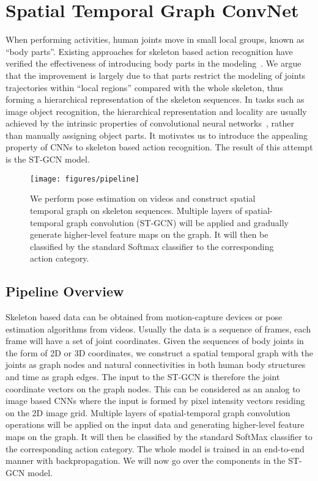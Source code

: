 \documentclass[letterpaper]{article} \usepackage{aaai18}  \usepackage{times}  \usepackage{helvet}  \usepackage{courier}  \usepackage{url}  \usepackage{graphicx}
\begin{document}
\section{Spatial Temporal Graph ConvNet}
When performing activities, human joints move in small local groups, known as ``body parts''.
Existing approaches for skeleton based action recognition have verified the effectiveness of introducing body parts in the modeling~\cite{Shahroudy2016CVPR,Liu2016ECCV,Zhang2017WACV}. 
We argue that the improvement is largely due to that parts restrict the modeling of joints trajectories within ``local regions'' compared with the whole skeleton, thus forming a hierarchical representation of the skeleton sequences.
In tasks such as image object recognition, the hierarchical representation and locality are usually achieved by the intrinsic properties of  convolutional neural networks~\cite{Krizhevsky2012Imagenet}, rather than manually assigning object parts.
It motivates us to introduce the appealing property of CNNs to skeleton based action recognition.
The result of this attempt is the ST-GCN model.
\begin{figure*}
	\centering
	\texttt{[image: figures/pipeline]}
	\caption{
		We perform pose estimation on videos and construct spatial temporal graph on skeleton sequences. Multiple layers
		of spatial-temporal graph convolution (ST-GCN) will be applied and gradually generate higher-level feature maps on the graph.
		It will then be classified by the standard Softmax classifier to the corresponding action category.
	}
	\label{fig:pipeline}
\end{figure*}
\subsection{Pipeline Overview}
Skeleton based data can be obtained from motion-capture devices or pose estimation algorithms from videos.
Usually the data is a sequence of frames, each frame will have a set of joint coordinates.
Given the sequences of body joints in the form of 2D or 3D coordinates, we construct a spatial temporal graph with the joints as graph nodes and natural connectivities in both human body structures and time as graph edges.
The input to the ST-GCN is therefore the joint coordinate vectors on the graph nodes. 
This can be considered as an analog to image based CNNs where the input is formed by pixel intensity vectors residing on the 2D image grid.
Multiple layers of spatial-temporal graph convolution operations will be applied on the input data and generating higher-level feature maps on the graph.
It will then be classified by the standard SoftMax classifier to the corresponding action category.
The whole model is trained in an end-to-end manner with backpropagation.
We will now go over the components in the ST-GCN model.
\end{document}
